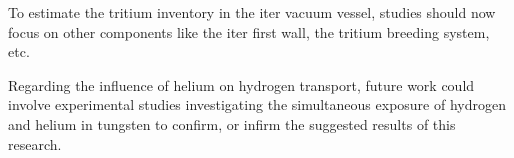 To estimate the tritium inventory in the \gls{iter} vacuum vessel, studies should now focus on other components like the \gls{iter} \gls{first wall}, the tritium breeding system, etc.

Regarding the influence of helium on hydrogen transport, future work could involve experimental studies investigating the simultaneous exposure of hydrogen and helium in tungsten to confirm, or infirm the suggested results of this research.


